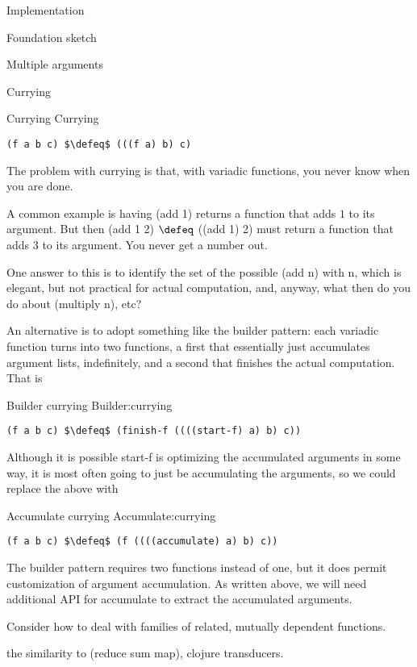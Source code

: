 \documentclass[12pt]{PalisadesLakesBook}
\begin{document}
\begin{plSection}{Implementation}
\begin{plSection}{Foundation sketch}
\begin{plSection}{Multiple arguments}
\begin{plSection}{Currying}
\begin{plListing}
{Currying}
{Currying}
\begin{lstlisting}[language=pseudocode]
(f a b c) $\defeq$ (((f a) b) c)
\end{lstlisting}
\end{plListing}

The problem with currying is that, with variadic functions,
you never know when you are done.

A common example is having
{\pseudocodeFont (add 1)} returns a function
that adds $1$ to its argument.
But then {\pseudocodeFont (add 1 2) $\defeq$  ((add 1) 2)}
must return a function that adds $3$ to its argument.
You never get a number out.

One answer to this is to identify the set of the possible
{\pseudocodeFont (add n)} with {\pseudocodeFont n},
which is elegant, but not practical for actual computation,
and, anyway, what then do you do about 
{\pseudocodeFont (multiply n)}, etc?

An alternative is to adopt something like the builder pattern:
each variadic function turns into two functions, 
a first that essentially just accumulates argument lists,
indefinitely, and a second that finishes the actual computation.
That is
\begin{plListing}
{Builder currying}
{Builder:currying}
\begin{lstlisting}[language=pseudocode]
(f a b c) $\defeq$ (finish-f ((((start-f) a) b) c))
\end{lstlisting}
\end{plListing}
Although it is possible {\pseudocodeFont start-f} 
is optimizing the accumulated arguments in some way,
it is most often going to just be accumulating the arguments,
so we could replace the above with
\begin{plListing}
{Accumulate currying}
{Accumulate:currying}
\begin{lstlisting}[language=pseudocode]
(f a b c) $\defeq$ (f ((((accumulate) a) b) c))
\end{lstlisting}
\end{plListing}
The builder pattern requires two functions instead of one,
but it does permit customization of argument accumulation.
As written above, we will need additional API for
{\pseudocodeFont accumulate} to extract the accumulated arguments.

\TODO
Consider how to deal with families 
of related, mutually dependent functions.

\NOTE
the similarity to {\pseudocodeFont (reduce sum map)},
clojure transducers.


\end{plSection}
\end{plSection}
\end{plSection}
\end{plSection}
\end{document}
